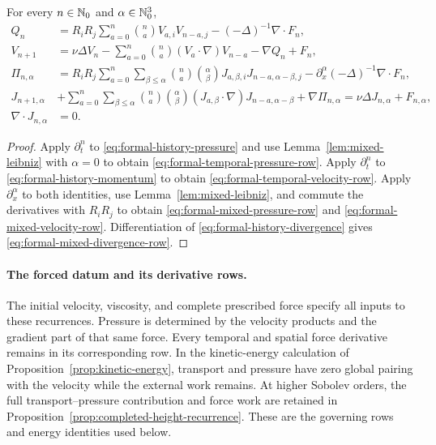 \begin{proposition}
\label{prop:formal-mixed-recurrences}
For every \(n\in\mathbb N_0\) and \(\alpha\in\mathbb N_0^3\),
\begin{align}
 Q_n
 &=R_iR_j
 \sum_{a=0}^{n}\binom na V_{a,i}V_{n-a,j}
 -(-\Delta)^{-1}\nabla\cdot F_n,
 \label{eq:formal-temporal-pressure-row}\\
 V_{n+1}
 &=
 \nu\Delta V_n
 -\sum_{a=0}^{n}\binom na(V_a\cdot\nabla)V_{n-a}
 -\nabla Q_n+F_n,
 \label{eq:formal-temporal-velocity-row}\\
 \Pi_{n,\alpha}
 &=R_iR_j
 \sum_{a=0}^{n}\sum_{\beta\le\alpha}
 \binom na\binom{\alpha}{\beta}
 J_{a,\beta,i}J_{n-a,\alpha-\beta,j}
 -\partial_x^\alpha(-\Delta)^{-1}\nabla\cdot F_n,
 \label{eq:formal-mixed-pressure-row}\\
 J_{n+1,\alpha}
 &+
 \sum_{a=0}^{n}\sum_{\beta\le\alpha}
 \binom na\binom{\alpha}{\beta}
 (J_{a,\beta}\cdot\nabla)
 J_{n-a,\alpha-\beta}
 +\nabla\Pi_{n,\alpha}
 =\nu\Delta J_{n,\alpha}+F_{n,\alpha},
 \label{eq:formal-mixed-velocity-row}\\
 \nabla\cdot J_{n,\alpha}&=0.
 \label{eq:formal-mixed-divergence-row}
\end{align}
\end{proposition}

\begin{proof}
Apply \(\partial_t^n\) to \eqref{eq:formal-history-pressure} and use
Lemma~\ref{lem:mixed-leibniz} with \(\alpha=0\) to obtain
\eqref{eq:formal-temporal-pressure-row}.  Apply \(\partial_t^n\) to
\eqref{eq:formal-history-momentum} to obtain
\eqref{eq:formal-temporal-velocity-row}.  Apply
\(\partial_x^\alpha\) to both identities, use
Lemma~\ref{lem:mixed-leibniz}, and commute the derivatives with \(R_iR_j\)
to obtain \eqref{eq:formal-mixed-pressure-row} and
\eqref{eq:formal-mixed-velocity-row}.  Differentiation of
\eqref{eq:formal-history-divergence} gives
\eqref{eq:formal-mixed-divergence-row}.
\end{proof}

\paragraph{The forced datum and its derivative rows.}
The initial velocity, viscosity, and complete prescribed force specify all
inputs to these recurrences.  Pressure is determined by the velocity products
and the gradient part of that same force.  Every temporal and spatial force
derivative remains in its corresponding row.  In the kinetic-energy
calculation of Proposition~\ref{prop:kinetic-energy}, transport and pressure
have zero global pairing with the velocity while the external work remains.
At higher Sobolev orders, the full transport--pressure contribution and force
work are retained in Proposition~\ref{prop:completed-height-recurrence}.
These are the governing rows and energy identities used below.

